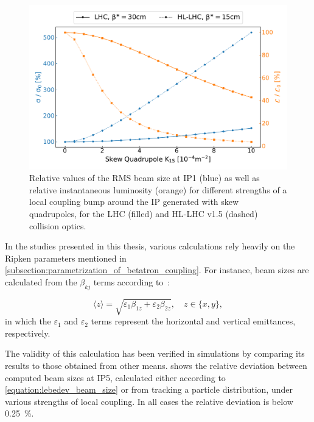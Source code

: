 \begin{figure}[!htb]
    \centering
    \includegraphics*[width=\textwidth]{Figures/IR_Coupling_Correction/lhc_vs_hllhc_combined.pdf}
    \caption{Relative values of the RMS beam size at IP\num{1} (\textcolor{mplblue}{blue}) as well as relative instantaneous luminosity (\textcolor{mplorange}{orange}) for different strengths of a local coupling bump around the IP generated with skew quadrupoles, for the LHC (filled) and HL-LHC v1.5 (dashed) collision optics.}%
    \label{figure:lhc_vs_hllhc_beam_size_and_lumi_growths}
\end{figure}

In the studies presented in this thesis, various calculations rely heavily on the Ripken parameters mentioned in \cref{subsection:parametrization_of_betatron_coupling}.
For instance, beam sizes are calculated from the \(\beta_{kj}\) terms according to~\cite{IOP:Lebedev:Betatron_Motion_Coupling}:

\begin{equation}
    \langle z \rangle = \sqrt{\varepsilon_1 \beta_{1z} + \varepsilon_2 \beta_{2z}}, \quad z \in\{x, y\} ,
    \label{equation:lebedev_beam_size}
\end{equation}
in which the \(\varepsilon_1\) and \(\varepsilon_2\) terms represent the horizontal and vertical emittances, respectively.

The validity of this calculation has been verified in simulations by comparing its results to those obtained from other means.
 shows the relative deviation between computed beam sizes at IP\num{5}, calculated either according to \cref{equation:lebedev_beam_size} or from tracking a particle distribution, under various strengths of local coupling.
In all cases the relative deviation is below \qty{0.25}{\percent}.

